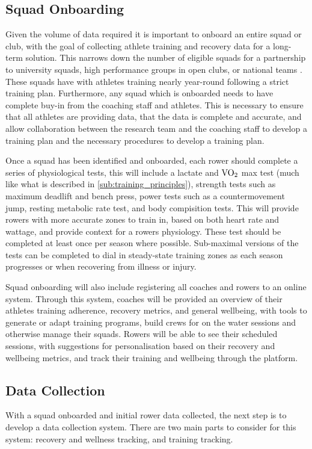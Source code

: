 \subsection{\label{sub:ideal-onboard}Squad Onboarding}
Given the volume of data required it is important to onboard an entire squad or club, with the goal of collecting athlete training and recovery data for a long-term solution. This narrows down the number of eligible squads for a partnership to university squads, high performance groups in open clubs, or national teams . These squads have with athletes training nearly year-round following a strict training plan. Furthermore, any squad which is onboarded needs to have complete buy-in from the coaching staff and athletes. This is necessary to ensure that all athletes are providing data, that the data is complete and accurate, and allow collaboration between the research team and the coaching staff to develop a training plan and the necessary procedures to develop a training plan.

Once a squad has been identified and onboarded, each rower should complete a series of physiological tests, this will include a lactate and $\textnormal{VO}_2$ max test (much like what is described in \autoref{sub:training_principles}), strength tests such as maximum deadlift and bench press, power tests such as a countermovement jump, resting metabolic rate test, and body compisition tests. This will provide rowers with more accurate zones to train in, based on both heart rate and wattage, and provide context for a rowers physiology. These test should be completed at least once per season where possible. Sub-maximal versions of the tests can be completed to dial in steady-state training zones as each season progresses or when recovering from illness or injury.

Squad onboarding will also include registering all coaches and rowers to an online system. Through this system, coaches will be provided an overview of their athletes training adherence, recovery metrics, and general wellbeing, with tools to generate or adapt training programs, build crews for on the water sessions and otherwise manage their squads. Rowers will be able to see their scheduled sessions, with suggestions for personalisation based on their recovery and wellbeing metrics, and track their training and wellbeing through the platform.

\subsection{\label{sub:ideal-data-collection}Data Collection}
With a squad onboarded and initial rower data collected, the next step is to develop a data collection system. There are two main parts to consider for this system: recovery and wellness tracking, and training tracking.

